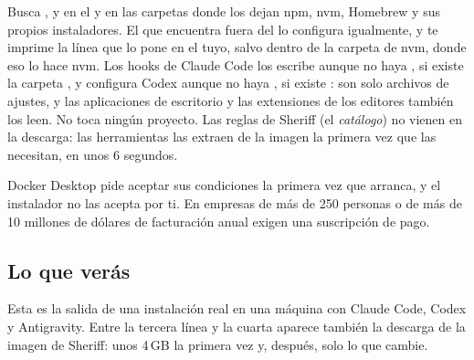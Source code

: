 \documentclass[11pt,a4paper]{article}
\begin{document}
Busca ,  y  en el  y en las
carpetas donde los dejan npm, nvm, Homebrew y sus propios instaladores. El
que encuentra fuera del  lo configura igualmente, y te imprime la
línea que lo pone en el tuyo, salvo dentro de la carpeta de nvm, donde eso lo
hace nvm. Los hooks de Claude Code los escribe aunque no
haya , si existe la carpeta , y configura Codex
aunque no haya , si existe : son solo archivos de
ajustes, y las aplicaciones de escritorio y las extensiones de los editores
también los leen. No toca ningún proyecto. Las reglas de Sheriff (el \emph{catálogo}) no
vienen en la descarga: las herramientas las extraen de la imagen la primera vez
que las necesitan, en unos 6 segundos.

\begin{warning}
Docker Desktop pide aceptar sus condiciones la primera vez que arranca, y el
instalador no las acepta por ti. En empresas de más de 250 personas o de más de
10 millones de dólares de facturación anual exigen una suscripción de pago.
\end{warning}

\subsection{Lo que verás}

Esta es la salida de una instalación real en una máquina con Claude Code,
Codex y Antigravity. Entre la tercera línea y la cuarta aparece también la descarga de la
imagen de Sheriff: unos 4\,GB la primera vez y, después, solo lo que cambie.
\end{document}
